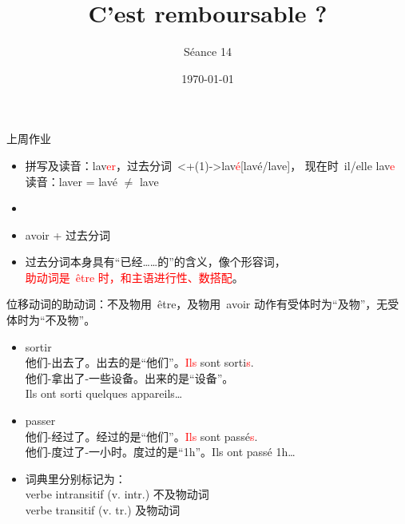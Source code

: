 \documentclass[french, aspectratio=169, 14pt, handout]{beamer}
\title[NdCS7-14]{C'est remboursable ?} %
\author{Séance 14} %
\date{\today} %
\newcommand{\red}[1]{\textcolor{red}{#1}} %
\begin{document}
\begin{CJK*}{UTF8}{gkai}

\begin{frame}
\titlepage %
\end{frame}

\begin{frame}{上周作业}
\begin{itemize}
	\item 拼写及读音：lav\red{er}，过去分词~\alt<+(1)->{lav\red{é}}{[lavé/lave]}， \pause 现在时~il/elle lav\red{e} \pause \\ 读音：laver = lavé $\neq$ lave \pause
    \item[]
    \item avoir + 过去分词
    \item 过去分词本身具有“已经……的”的含义，像个形容词， \pause \\ \red{助动词是~être 时，和主语进行性、数搭配}。
\end{itemize}
\end{frame}

\begin{frame}{位移动词的助动词：不及物用~être，及物用~avoir}
动作有受体时为“及物”，无受体时为“不及物”。 \pause
\begin{itemize}
    \item sortir \\
	他们-出去了。出去的是“他们”。\red{Ils} sont sorti\red{s}. \\
    他们-拿出了-一些设备。出来的是“设备”。\\ \hspace{170px} Ils ont sorti quelques appareils… \pause
    \item passer \\
    他们-经过了。经过的是“他们”。\red{Ils} sont passé\red{s}. \\
    他们-度过了-一小时。度过的是“1h”。Ils ont passé 1h… \pause
    \item 词典里分别标记为： \\
    verbe intransitif (v. intr.) 不及物动词 \\
    verbe transitif (v. tr.) 及物动词
\end{itemize}
\end{frame}


\end{CJK*}
\end{document}
